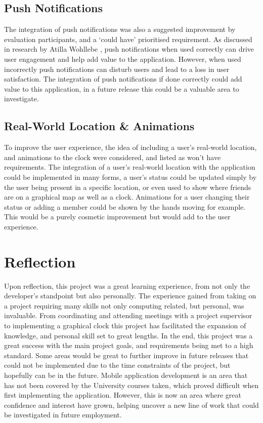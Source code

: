 \subsection*{Push Notifications}
The integration of push notifications was also a suggested improvement by evaluation participants, and a `could have' prioritised requirement. As discussed in research by Atilla Wohllebe \cite{pushNoti}, push notifications when used correctly can drive user engagement and help add value to the application. However, when used incorrectly push notifications can disturb users and lead to a loss in user satisfaction. The integration of push notifications if done correctly could add value to this application, in a future release this could be a valuable area to investigate.

\subsection*{Real-World Location \& Animations}
To improve the user experience, the idea of including a user's real-world location, and animations to the clock were considered, and listed as won't have requirements. The integration of a user's real-world location with the application could be implemented in many forms, a user's status could be updated simply by the user being present in a specific location, or even used to show where friends are on a graphical map as well as a clock. Animations for a user changing their status or adding a member could be shown by the hands moving for example. This would be a purely cosmetic improvement but would add to the user experience.

\section{Reflection}

Upon reflection, this project was a great learning experience, from not only the developer's standpoint but also personally. The experience gained from taking on a project requiring many skills not only computing related, but personal, was invaluable. From coordinating and attending meetings with a project supervisor to implementing a graphical clock this project has facilitated the expansion of knowledge, and personal skill set to great lengths. In the end, this project was a great success with the main project goals, and requirements being met to a high standard. Some areas would be great to further improve in future releases that could not be implemented due to the time constraints of the project, but hopefully can be in the future. Mobile application development is an area that has not been covered by the University courses taken, which proved difficult when first implementing the application. However, this is now an area where great confidence and interest have grown, helping uncover a new line of work that could be investigated in future employment.  